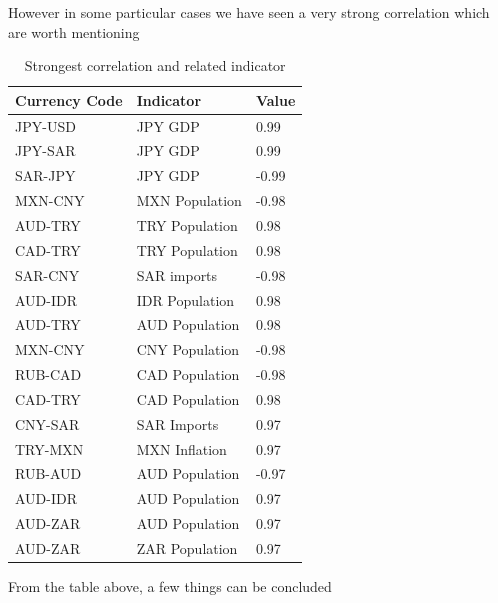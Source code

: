 However in some particular cases we have seen a very strong correlation which are worth mentioning
\begin{table}[!h]
\centering
\caption{Strongest correlation and related indicator}
\label{my-label}
\begin{tabular}{|l|l|l|}
\hline
Currency Code  & Indicator       & Value \\ \hline
JPY-USD        & JPY GDP         & 0.99  \\ \hline
JPY-SAR        & JPY GDP         & 0.99  \\ \hline
SAR-JPY        & JPY GDP         & -0.99 \\ \hline
MXN-CNY        & MXN Population  & -0.98 \\ \hline
AUD-TRY        & TRY Population  & 0.98  \\ \hline
CAD-TRY        & TRY Population  & 0.98  \\ \hline
SAR-CNY        & SAR imports     & -0.98 \\ \hline
AUD-IDR        & IDR Population  & 0.98  \\ \hline
AUD-TRY        & AUD Population  & 0.98  \\ \hline
MXN-CNY        & CNY Population  & -0.98 \\ \hline
RUB-CAD        & CAD Population  & -0.98 \\ \hline
CAD-TRY        & CAD Population  & 0.98  \\ \hline
CNY-SAR        & SAR Imports     & 0.97  \\ \hline
TRY-MXN        & MXN Inflation   & 0.97  \\ \hline
RUB-AUD        & AUD Population  & -0.97 \\ \hline
AUD-IDR        & AUD Population  & 0.97  \\ \hline
AUD-ZAR        & AUD Population  & 0.97  \\ \hline
AUD-ZAR        & ZAR Population & 0.97  \\ \hline
\end{tabular}
\end{table}

From the table above, a few things can be concluded

